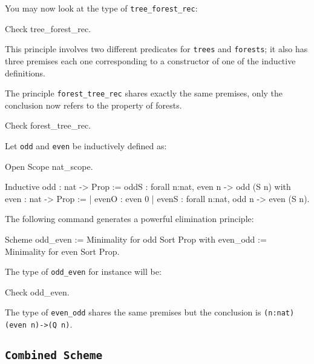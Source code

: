 \begin{coq_example*}
You may now look at the type of {\tt tree\_forest\_rec}:

\begin{coq_example}
Check tree_forest_rec.
\end{coq_example}

This principle involves two different predicates for {\tt trees} and
{\tt forests}; it also has three premises each one corresponding to a
constructor of one of the inductive definitions.

The principle {\tt forest\_tree\_rec} shares exactly the same
premises, only the conclusion now refers to the property of forests.

\begin{coq_example}
Check forest_tree_rec.
\end{coq_example}


Let {\tt odd} and {\tt even} be inductively defined as:

\begin{coq_eval}
Open Scope nat_scope.
\end{coq_eval}

\begin{coq_example*}
Inductive odd : nat -> Prop :=
    oddS : forall n:nat, even n -> odd (S n)
with even : nat -> Prop :=
  | evenO : even 0
  | evenS : forall n:nat, odd n -> even (S n).
\end{coq_example*}

The following command generates a powerful elimination
principle:

\begin{coq_example}
Scheme odd_even := Minimality for   odd Sort Prop
  with even_odd := Minimality for even Sort Prop.
\end{coq_example}

The type of {\tt odd\_even} for instance will be:

\begin{coq_example}
Check odd_even.
\end{coq_example}

The type of {\tt even\_odd} shares the same premises but the
conclusion is {\tt (n:nat)(even n)->(Q n)}.

\subsection[{\tt Combined Scheme}]{{\tt Combined Scheme}
\label{CombinedScheme-examples}}


\end{coq_example*}
